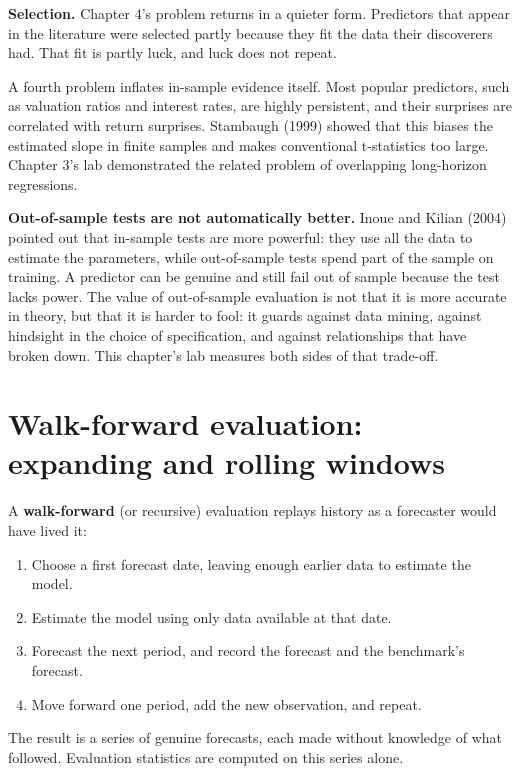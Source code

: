 \textbf{Selection.} Chapter 4's problem returns in a quieter form. Predictors that appear in the literature were selected partly because they fit the data their discoverers had. That fit is partly luck, and luck does not repeat.

A fourth problem inflates in-sample evidence itself. Most popular predictors, such as valuation ratios and interest rates, are highly persistent, and their surprises are correlated with return surprises. Stambaugh (1999) showed that this biases the estimated slope in finite samples and makes conventional t-statistics too large. Chapter 3's lab demonstrated the related problem of overlapping long-horizon regressions.

\textbf{Out-of-sample tests are not automatically better.} Inoue and Kilian (2004) pointed out that in-sample tests are more powerful: they use all the data to estimate the parameters, while out-of-sample tests spend part of the sample on training. A predictor can be genuine and still fail out of sample because the test lacks power. The value of out-of-sample evaluation is not that it is more accurate in theory, but that it is harder to fool: it guards against data mining, against hindsight in the choice of specification, and against relationships that have broken down. This chapter's lab measures both sides of that trade-off.

\section{Walk-forward evaluation: expanding and rolling windows}
\label{sec:05-walkforward}

A \textbf{walk-forward} (or recursive) evaluation replays history as a forecaster would have lived it:

\begin{enumerate}
  \item Choose a first forecast date, leaving enough earlier data to estimate the model.
  \item Estimate the model using only data available at that date.
  \item Forecast the next period, and record the forecast and the benchmark's forecast.
  \item Move forward one period, add the new observation, and repeat.
\end{enumerate}

The result is a series of genuine forecasts, each made without knowledge of what followed. Evaluation statistics are computed on this series alone.

